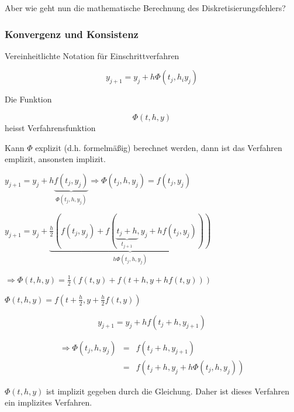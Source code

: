 \documentclass[10pt,a4paper]{article}
\begin{document}
Aber wie geht nun die mathematische Berechnung des Diskretisierungsfehlers?

\subsubsection{Konvergenz und Konsistenz}

Vereinheitlichte Notation für Einschrittverfahren

\begin{equation}
y_{j+1} = y_j + h \Phi (t_j, h_i y_j)
\end{equation}

\begin{defi}

Die Funktion 

\begin{equation*}
\Phi(t,h,y)
\end{equation*}
heisst Verfahrensfunktion

Kann $\Phi$ explizit (d.h. formelmäßig) berechnet werden, dann ist das Verfahren emplizit, ansonsten implizit.
\end{defi}

\begin{bsp}


$y_{j+1}=y_j+h\underbrace{f(t_j,y_j)}_{\Phi(t_j,h,y_j)} \Rightarrow \Phi(t_j,h,y_j)=f(t_j,y_j)$


\end{bsp}

\begin{bsp}



$y_{j+1}=y_j+ \underbrace{\frac{h}{2} (f(t_j,y_j) + f( \underbrace{t_j+h}_{t_{j+1}},y_j+hf(t_j,y_j)))}_{h\Phi(t_j,h,y_j)}$

$\Rightarrow \Phi(t,h,y)=\frac{1}{2}(f(t,y)+f(t+h,y+hf(t,y)))$
\end{bsp}


\begin{bsp}



$ \Phi(t,h,y)=f(t+\frac{h}{2},y+\frac{h}{2}f(t,y))$
\end{bsp}



\begin{bsp}

\begin{equation*}
y_{j+1}=y_j+hf(t_j+h,y_{j+1})
\end{equation*}

\begin{eqnarray*}
\Rightarrow \Phi(t_j,h,y_j)&=&f(t_j+h,y_{j+1}) \\
&=& f(t_j+h,y_j+h\Phi(t_j,h,y_j))
\end{eqnarray*}


$\Phi(t,h,y)$ ist implizit gegeben durch die Gleichung. Daher ist dieses Verfahren ein implizites Verfahren.
\end{bsp}
\end{document}

